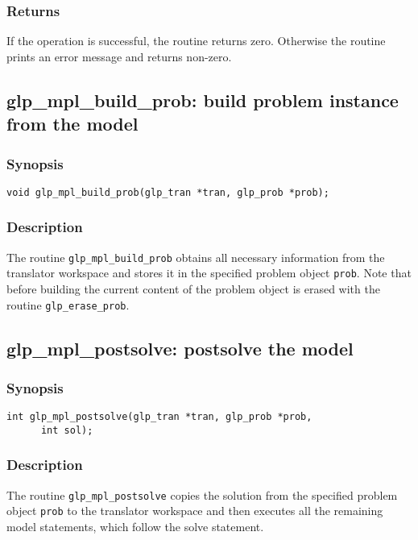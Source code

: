 \subsubsection*{Returns}

If the operation is successful, the routine returns zero. Otherwise
the routine prints an error message and returns non-zero.

\subsection{glp\_mpl\_build\_prob: build problem instance from the
model}

\subsubsection*{Synopsis}

\begin{verbatim}
void glp_mpl_build_prob(glp_tran *tran, glp_prob *prob);
\end{verbatim}

\subsubsection*{Description}

The routine \verb|glp_mpl_build_prob| obtains all necessary information
from the translator workspace and stores it in the specified problem
object \verb|prob|. Note that before building the current content of
the problem object is erased with the routine \verb|glp_erase_prob|.

\subsection{glp\_mpl\_postsolve: postsolve the model}

\subsubsection*{Synopsis}

\begin{verbatim}
int glp_mpl_postsolve(glp_tran *tran, glp_prob *prob,
      int sol);
\end{verbatim}

\subsubsection*{Description}

The routine \verb|glp_mpl_postsolve| copies the solution from the
specified problem object \verb|prob| to the translator workspace and
then executes all the remaining model statements, which follow the
solve statement.

